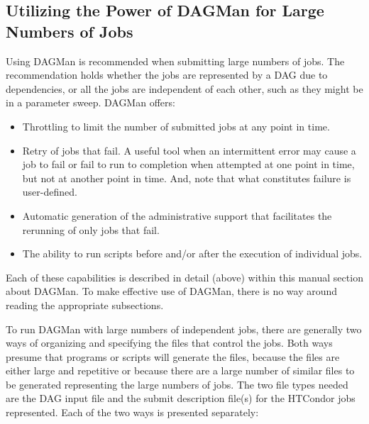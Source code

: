 \subsection{\label{sec:DAGLotsaJobs}Utilizing the Power of DAGMan for Large Numbers of Jobs}

Using DAGMan is recommended when submitting large numbers of jobs.
The recommendation holds whether the jobs are represented by
a DAG due to dependencies, or all the jobs are
independent of each other, such as they might be in a parameter sweep.
DAGMan offers:
\begin{itemize}
\item{Throttling}
  to limit the number of submitted jobs at any point in time.
\item{Retry of jobs that fail.}
  A useful tool when an intermittent error may cause a job to fail
  or fail to run to completion when attempted at one point in time,
  but not at another point in time.
  And, note that what constitutes failure is user-defined.
\item{Automatic generation of the administrative support that facilitates the
  rerunning of only jobs that fail.}
\item{The ability to run scripts before and/or after the execution of
individual jobs.}
\end{itemize}

Each of these capabilities is described in detail (above)
within this manual section about DAGMan.
To make effective use of DAGMan, there is no way around reading the 
appropriate subsections.

To run DAGMan with large numbers of independent jobs,
there are generally two ways of organizing and specifying the
files that control the jobs.
Both ways presume that programs or scripts will generate the files,
because the files are either large and repetitive
or because there are a large number of similar files to be
generated representing the large numbers of jobs.
The two file types needed are the DAG input file and the
submit description file(s) for the HTCondor jobs represented.
Each of the two ways is presented separately:

